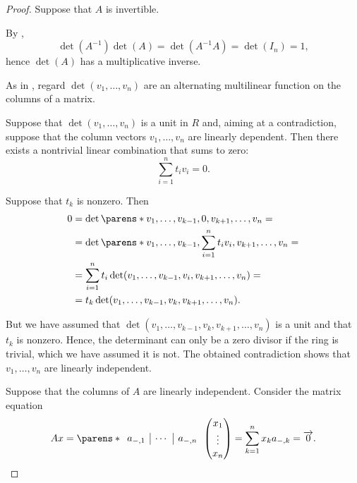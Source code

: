 \begin{proof}
   Suppose that \( A \) is invertible.

  By ,
  \begin{equation*}
    \det(A^{-1}) \det(A) = \det(A^{-1} A) = \det(I_n) = 1,
  \end{equation*}
  hence \( \det(A) \) has a multiplicative inverse.

   As in , regard \( \det(v_1, \ldots, v_n) \) are an alternating multilinear function on the columns of a matrix.

  Suppose that \( \det(v_1, \ldots, v_n) \) is a unit in \( R \) and, aiming at a contradiction, suppose that the column vectors \( v_1, \ldots, v_n \) are linearly dependent. Then there exists a nontrivial linear combination that sums to zero:
  \begin{equation*}
    \sum_{i=1}^n t_i v_i = 0.
  \end{equation*}

  Suppose that \( t_k \) is nonzero. Then
  \begin{align*}
    0
    &=
    \det\parens*{ v_1, \ldots, v_{k-1}, 0, v_{k+1}, \ldots, v_n }
    = \\ &=
    \det\parens*{ v_1, \ldots, v_{k-1}, \sum_{i=1}^n t_i v_i, v_{k+1}, \ldots, v_n }
    = \\ &=
    \sum_{i=1}^n t_i \det( v_1, \ldots, v_{k-1}, v_i, v_{k+1}, \ldots, v_n )
    = \\ &=
    t_k \det( v_1, \ldots, v_{k-1}, v_k, v_{k+1}, \ldots, v_n ).
  \end{align*}

  But we have assumed that \( \det( v_1, \ldots, v_{k-1}, v_k, v_{k+1}, \ldots, v_n ) \) is a unit and that \( t_k \) is nonzero. Hence, the determinant can only be a zero divisor if the ring is trivial, which we have assumed it is not. The obtained contradiction shows that \( v_1, \ldots, v_n \) are linearly independent.

   Suppose that the columns of \( A \) are linearly independent. Consider the matrix equation
  \begin{equation*}
    Ax
    =
    \parens*
    {
      \begin{array}{c|c|c}
        a_{\anon*,1} & \cdots & a_{\anon*,n}
      \end{array}
    }
    \begin{pmatrix}
      x_1 \\ \vdots \\ x_n
    \end{pmatrix}
    =
    \sum_{k=1}^n x_k a_{\anon*,k}
    =
    \vect 0.
  \end{equation*}


\end{proof}
